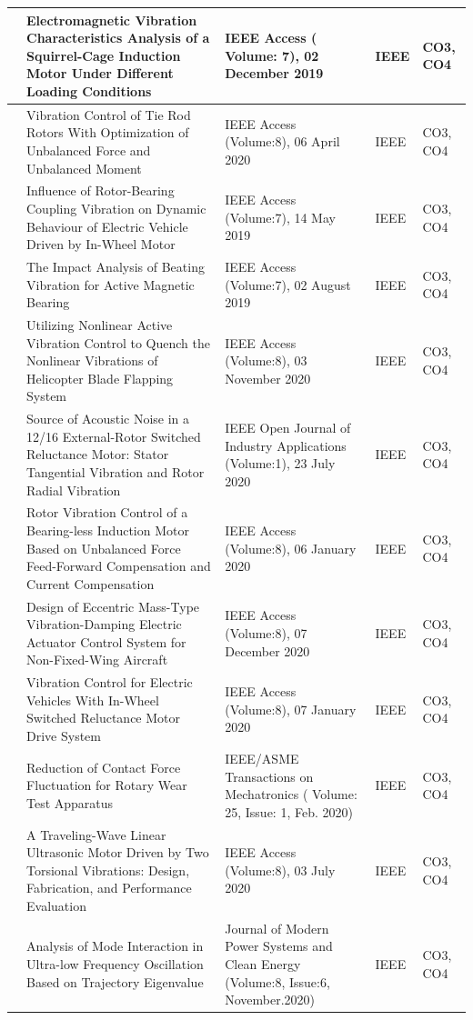 \documentclass[11pt,paper=a4,answers]{exam}
\begin{document}
\begin{flushleft}
\begin{longtable}{|>{\centering\arraybackslash}p{1.4cm}  |  >{\raggedright\arraybackslash}p{6cm} |>{\centering\arraybackslash}p{3.75cm}|>{\centering\arraybackslash}p{2cm} |>{\centering\arraybackslash}p{2cm} |}
38&Electromagnetic Vibration Characteristics Analysis of a Squirrel-Cage Induction Motor Under Different Loading Conditions&IEEE Access ( Volume: 7), 02 December 2019&IEEE&CO3, CO4\\\hline
39&Vibration Control of Tie Rod Rotors With Optimization of Unbalanced Force and Unbalanced Moment& IEEE Access (Volume:8), 06 April 2020&IEEE&CO3, CO4\\\hline
40&Influence of Rotor-Bearing Coupling Vibration on Dynamic Behaviour of Electric Vehicle Driven by In-Wheel Motor&IEEE Access (Volume:7), 14 May 2019&IEEE&CO3, CO4\\\hline
41&The Impact Analysis of Beating Vibration for Active Magnetic Bearing&IEEE Access (Volume:7), 02 August 2019&IEEE&CO3, CO4\\\hline
42&Utilizing Nonlinear Active Vibration Control to Quench the Nonlinear Vibrations of Helicopter Blade Flapping System&IEEE Access (Volume:8), 03 November 2020&IEEE&CO3, CO4\\\hline
43&Source of Acoustic Noise in a 12/16 External-Rotor Switched Reluctance Motor: Stator Tangential Vibration and Rotor Radial Vibration&IEEE Open Journal of Industry Applications (Volume:1), 23 July 2020&IEEE&CO3, CO4\\\hline
44&Rotor Vibration Control of a Bearing-less Induction Motor Based on Unbalanced Force Feed-Forward Compensation and Current Compensation&IEEE Access (Volume:8), 06 January 2020&IEEE&CO3, CO4\\\hline
45&Design of Eccentric Mass-Type Vibration-Damping Electric Actuator Control System for Non-Fixed-Wing Aircraft&IEEE Access (Volume:8), 07 December 2020&IEEE&CO3, CO4\\\hline
46&Vibration Control for Electric Vehicles With In-Wheel Switched Reluctance Motor Drive System&IEEE Access (Volume:8), 07 January 2020&IEEE&CO3, CO4\\\hline
47&Reduction of Contact Force Fluctuation for Rotary Wear Test Apparatus&IEEE/ASME Transactions on Mechatronics ( Volume: 25, Issue: 1, Feb. 2020)&IEEE&CO3, CO4\\\hline
48&A Traveling-Wave Linear Ultrasonic Motor Driven by Two Torsional Vibrations: Design, Fabrication, and Performance Evaluation&IEEE Access (Volume:8), 03 July 2020&IEEE&CO3, CO4\\\hline
49&Analysis of Mode Interaction in Ultra-low Frequency Oscillation Based on Trajectory Eigenvalue&Journal of Modern Power Systems and Clean Energy (Volume:8, Issue:6, November.2020)&IEEE&CO3, CO4\\\hline

\end{longtable}
\end{flushleft}
\end{document}
